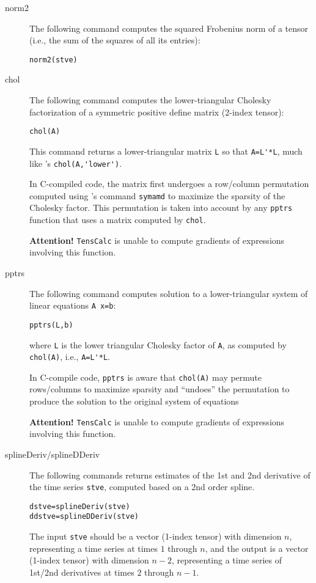 \documentclass[11pt]{article}
\newcommand{\TC}{\texttt{TensCalc}}
\theoremstyle{remark}
\begin{document}
\begin{description}
\item[norm2] The following command computes the squared Frobenius norm
  of a tensor (i.e., the sum of the squares of all its entries):
\begin{lstlisting}
norm2(stve)
\end{lstlisting}

\item[chol] The following command computes the lower-triangular
  Cholesky factorization of a symmetric positive define matrix
  (2-index tensor):
\begin{lstlisting}
chol(A)
\end{lstlisting}
  This command returns a lower-triangular matrix \lstinline{L} so that
  \lstinline{A=L'*L}, much like \matlab's
  \lstinline{chol(A,'lower')}.

  In C-compiled code, the matrix first undergoes a row/column
  permutation computed using \matlab{}'s command \lstinline{symamd} to
  maximize the sparsity of the Cholesky factor. This permutation is
  taken into account by any \lstinline{pptrs} function that uses a
  matrix computed by \lstinline{chol}.

  \textbf{Attention!} \TC{} is unable to compute gradients of
  expressions involving this function.

\item[pptrs] The following command computes solution to a
  lower-triangular system of linear equations \lstinline{A x=b}:
\begin{lstlisting}
pptrs(L,b)
\end{lstlisting}
  where \lstinline{L} is the lower triangular Cholesky factor of
  \lstinline{A}, as computed by \lstinline{chol(A)}, i.e.,
  \lstinline{A=L'*L}.

  In C-compile code, \lstinline{pptrs} is aware that
  \lstinline{chol(A)} may permute rows/columns to maximize sparsity
  and ``undoes'' the permutation to produce the solution to the
  original system of equations

  \textbf{Attention!} \TC{} is unable to compute gradients of
  expressions involving this function.

\item[splineDeriv/splineDDeriv] The following commands returns
  estimates of the 1st and 2nd derivative of the time series
  \lstinline{stve}, computed based on a 2nd order spline.
\begin{lstlisting}
dstve=splineDeriv(stve)
ddstve=splineDDeriv(stve)
\end{lstlisting}
  The input \lstinline{stve} should be a vector (1-index tensor) with
  dimension $n$, representing a time series at times $1$ through $n$,
  and the output is a vector (1-index tensor) with dimension $n-2$,
  representing a time series of 1st/2nd derivatives at times $2$
  through $n-1$.
  

\end{description}
\end{document}

